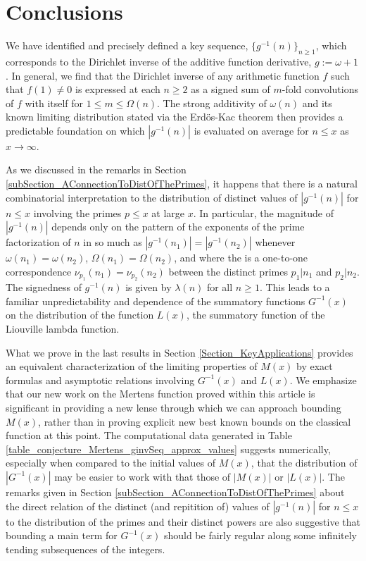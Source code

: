 \documentclass[11pt,reqno,a4letter]{article}
\numberwithin{figure}{section}
\numberwithin{table}{section}
\theoremstyle{plain}
\numberwithin{theorem}{section}
\theoremstyle{definition}
\begin{document}
\newpage
\section{Conclusions}

We have identified and precisely defined a key sequence, 
$\{g^{-1}(n)\}_{n \geq 1}$, which corresponds to the Dirichlet inverse of the 
additive function derivative, $g := \omega + 1$. In general, we find that the 
Dirichlet inverse of any arithmetic function $f$ such that $f(1) \neq 0$ is 
expressed at each $n \geq 2$ as a signed sum of $m$-fold convolutions of $f$ 
with itself for $1 \leq m \leq \Omega(n)$. The strong additivity of 
$\omega(n)$ and its known limiting distribution stated via the 
Erd\"{o}s-Kac theorem then provides a predictable 
foundation on which $|g^{-1}(n)|$ is 
evaluated on average for $n \leq x$ as $x \rightarrow \infty$. 

As we discussed in the remarks in 
Section \ref{subSection_AConnectionToDistOfThePrimes}, 
it happens that there is a natural combinatorial interpretation to the 
distribution of distinct values 
of $|g^{-1}(n)|$ for $n \leq x$ involving the primes $p \leq x$ at large $x$. 
In particular, the magnitude of $|g^{-1}(n)|$ depends only on the pattern of 
the exponents of the prime factorization of $n$ in so much as 
$|g^{-1}(n_1)| = |g^{-1}(n_2)|$ whenever $\omega(n_1) = \omega(n_2)$, 
$\Omega(n_1) = \Omega(n_2)$, and where the is a one-to-one correspondence 
$\nu_{p_1}(n_1) = \nu_{p_2}(n_2)$ between the distinct primes 
$p_1|n_1$ and $p_2|n_2$. 
The signedness of $g^{-1}(n)$ is given by $\lambda(n)$ for all $n \geq 1$. 
This leads to a familiar unpredictability and dependence of the 
summatory functions $G^{-1}(x)$ on the distribution of the function 
$L(x)$, the summatory function of the Liouville lambda function. 

What we prove in the last results in 
Section \ref{Section_KeyApplications} 
provides an equivalent characterization of the limiting properties of 
$M(x)$ by exact formulas and asymptotic relations involving 
$G^{-1}(x)$ and $L(x)$. 
We emphasize that our new work on the Mertens function proved within this article 
is significant in providing a new lense through which we can approach bounding 
$M(x)$, rather than in proving explicit new best known bounds on the classical 
function at this point. 
The computational data generated in 
Table \ref{table_conjecture_Mertens_ginvSeq_approx_values} 
suggests numerically, especially when compared to the initial values of $M(x)$, 
that the distribution of $|G^{-1}(x)|$ may be easier to work with 
that those of $|M(x)|$ or $|L(x)|$. 
The remarks given in Section \ref{subSection_AConnectionToDistOfThePrimes} 
about the direct relation of the distinct (and repitition of) values of $|g^{-1}(n)|$ 
for $n \leq x$ to the distribution of the primes and their distinct powers are 
also suggestive that bounding a main term for $G^{-1}(x)$ should be fairly 
regular along some infinitely tending subsequences of the integers. 
\end{document}
